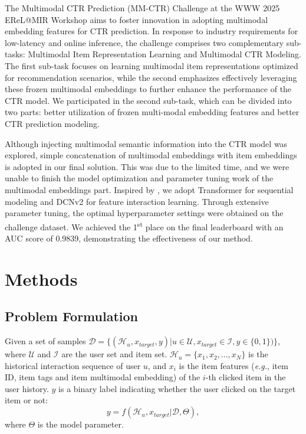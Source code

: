\documentclass[sigconf, nonacm, screen]{acmart}
\begin{document}
The Multimodal CTR Prediction (MM-CTR) Challenge at the WWW 2025 EReL@MIR Workshop\cite{EReL} aims to foster innovation in adopting multimodal embedding features for CTR prediction.
In response to industry requirements for low-latency and online inference, the challenge comprises two complementary sub-tasks: Multimodal Item Representation Learning and Multimodal CTR Modeling. 
The first sub-task focuses on learning multimodal item representations optimized for recommendation scenarios, while the second emphasizes effectively leveraging these frozen multimodal embeddings to further enhance the performance of the CTR model. 
We participated in the second sub-task, which can be divided into two parts: better utilization of frozen multi-modal embedding features and better CTR prediction modeling.

Although injecting multimodal semantic information into the CTR model was explored, simple concatenation of multimodal embeddings with item embeddings is adopted in our final solution. 
This was due to the limited time, and we were unable to finish the model optimization and parameter tuning work of the multimodal embeddings part.
Inspired by \cite{TransAct}, we adopt Transformer for sequential modeling and DCNv2\cite{DCNv2} for feature interaction learning.
Through extensive parameter tuning, the optimal hyperparameter settings were obtained on the challenge dataset.
We achieved the 1\textsuperscript{st} place on the final leaderboard with an AUC score of 0.9839, demonstrating the effectiveness of our method.

\section{Methods}

\subsection{Problem Formulation}
Given a set of samples $\mathcal{D} = \{(\mathcal{H}_u, x_{target}, y) | u\in\mathcal{U}, x_{target}\in\mathcal{I}, y\in\{0, 1\})\}$, 
where \(\mathcal{U}\) and \(\mathcal{I}\) are the user set and item set. $\mathcal{H}_u = \{x_1, x_2, \ldots, x_N\}$ is the historical interaction sequence of user \(u\), and $x_i$ is the item features (\emph{e.g.}, item ID, item tags and item multimodal embedding) of the \(i\)-th clicked item in the user history. 
\(y\) is a binary label indicating whether the user clicked on the target item or not:
\begin{equation}
  y = f\left(\mathcal{H}_u, x_{target}| \mathcal{D}, \Theta\right),
\end{equation}
where $\Theta$ is the model parameter.
\end{document}
